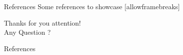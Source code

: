 \documentclass[10pt]{beamer}
\newcommand{\themename}{\textbf{\textsc{metropolis}}\xspace}
\begin{document}
%					
%					
%					
%					
%					
%	
	
	\begin{frame}{References}
		Some references to showcase [allowframebreaks] \cite{knuth92,ConcreteMath,Simpson,Er01,greenwade93}
	\end{frame}
	
    
	
	
	{
		\begin{frame}[standout]
			Thanks for you attention!\\ Any Question ?
		\end{frame}
	}
	
	\appendix
	
	
	\begin{frame}[allowframebreaks]{References}
		
		
	\end{frame}
	
\end{document}
